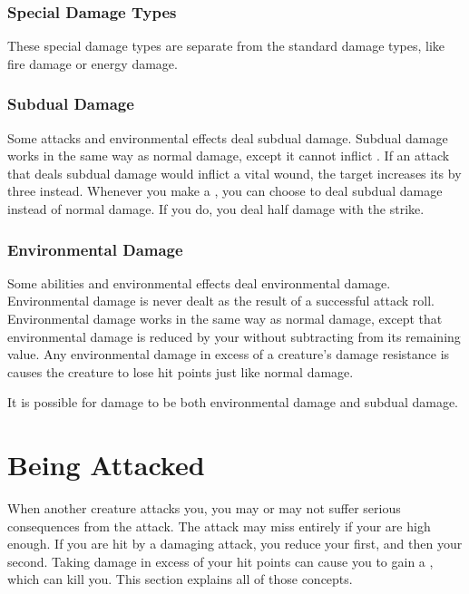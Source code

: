         \subsubsection{Special Damage Types}\label{Special Damage Types}

            These special damage types are separate from the standard damage types, like fire damage or energy damage.

            \subsubsection{Subdual Damage}\label{Subdual Damage}
                Some attacks and environmental effects deal subdual damage.
                Subdual damage works in the same way as normal damage, except it cannot inflict .
                If an attack that deals subdual damage would inflict a vital wound, the target increases its  by three instead.
                Whenever you make a , you can choose to deal subdual damage instead of normal damage.
                If you do, you deal half damage with the strike.

            \subsubsection{Environmental Damage}\label{Environmental Damage}
                Some abilities and environmental effects deal environmental damage.
                Environmental damage is never dealt as the result of a successful attack roll.
                Environmental damage works in the same way as normal damage, except that environmental damage is reduced by your  without subtracting from its remaining value.
                Any environmental damage in excess of a creature's damage resistance is causes the creature to lose hit points just like normal damage.

                It is possible for damage to be both environmental damage and subdual damage.

\section{Being Attacked}\label{Being Attacked}
    When another creature attacks you, you may or may not suffer serious consequences from the attack.
    The attack may miss entirely if your  are high enough.
    If you are hit by a damaging attack, you reduce your  first, and then your  second.
    Taking damage in excess of your hit points can cause you to gain a , which can kill you.
    This section explains all of those concepts.

